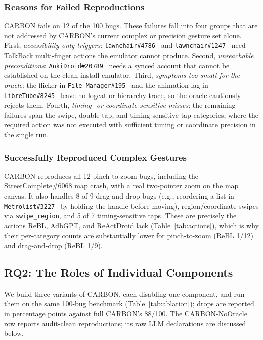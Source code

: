 \documentclass[10pt,conference,a4paper]{IEEEtran}
\begin{document}
  \subsubsection{Reasons for Failed Reproductions}
  \label{sec:rq1-failures}
  CARBON fails on 12 of the 100 bugs. These failures fall into four groups
  that are not addressed by CARBON's current complex or precision gesture
  set alone. First,
  \emph{accessibility-only triggers}: \texttt{lawnchair\#4786}~\cite{lawnchair4786}
  and \texttt{lawnchair\#1247}~\cite{lawnchair1247} need TalkBack
  multi-finger actions the emulator cannot produce. Second,
  \emph{unreachable preconditions}: \texttt{AnkiDroid\#20789}~\cite{anki20789}
  needs a synced account that cannot be established on the clean-install
  emulator.
  Third, \emph{symptoms too small for the oracle}: the flicker in
  \texttt{File-Manager\#195}~\cite{filemanager195} and the animation lag
  in \texttt{LibreTube\#8245}~\cite{libretube8245} leave no logcat or
  hierarchy trace, so the oracle cautiously rejects them.
  Fourth, \emph{timing- or coordinate-sensitive misses}: the remaining
  failures span the swipe, double-tap, and timing-sensitive tap
  categories, where the required action was not executed with sufficient
  timing or coordinate precision in the single run.

  \subsubsection{Successfully Reproduced Complex Gestures}
  CARBON reproduces all 12 pinch-to-zoom bugs, including the
  StreetComplete\#6068 map crash, with a real two-pointer zoom on the map
  canvas. It also handles 8 of 9 drag-and-drop bugs (e.g., reordering a
  list in \texttt{Metrolist\#3227}~\cite{metrolist3227} by holding the
  handle before moving), region/coordinate swipes via
  \texttt{swipe\_region}, and 5 of 7 timing-sensitive taps. These are
  precisely the actions ReBL, AdbGPT, and ReActDroid lack
  (Table~\ref{tab:actions}), which is why their per-category counts are
  substantially lower for pinch-to-zoom (ReBL 1/12) and drag-and-drop
  (ReBL 1/9).

  \subsection{RQ2: The Roles of Individual Components}
  \label{sec:rq2}

  We build three variants of CARBON, each disabling one component, and
  run them on the same 100-bug benchmark (Table~\ref{tab:ablation});
  drops are reported in percentage points against full CARBON's 88/100.
  The CARBON-NoOracle row reports audit-clean reproductions; its raw LLM
  declarations are discussed below.
\end{document}
